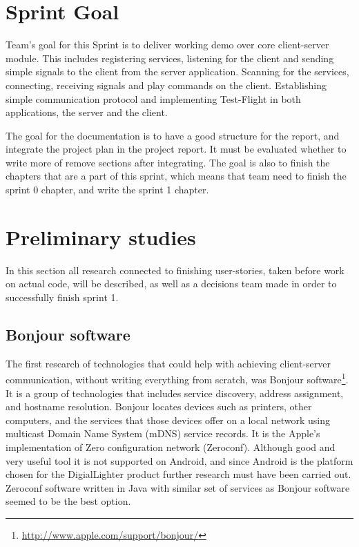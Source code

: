 \section{Sprint Goal}

Team's goal for this Sprint is to deliver working demo over core client-server module.
This includes registering services, listening for the client and sending simple signals to the client from the server application.
Scanning for the services, connecting, receiving signals and play commands on the client.
Establishing simple communication protocol and implementing Test-Flight in both applications, the server and the client.

The goal for the documentation is to have a good structure for the report, and integrate the project plan in the project report. It must be evaluated whether to write more of remove sections after integrating. The goal is also to finish the chapters that are a part of this sprint, which means that team need to finish the sprint 0 chapter, and write the sprint 1 chapter.

\section {Preliminary studies}
In this section all research connected to finishing user-stories, taken before work on actual code, will be described, as well as a decisions team made in order to successfully finish sprint 1.

\subsection{Bonjour software}
The first research of technologies that could help with achieving client-server communication, without writing everything from scratch, was Bonjour software\footnote{\url{http://www.apple.com/support/bonjour/}}. 
It is a group of technologies that includes service discovery, address assignment, and hostname resolution. 
Bonjour locates devices such as printers, other computers, and the services that those devices offer on a local network using multicast Domain Name System (mDNS) service records.
It is the Apple's implementation of Zero configuration network (Zeroconf).
Although good and very useful tool it is not supported on Android, and since Android is the platform chosen for the DigialLighter product further research must have been carried out.
Zeroconf software written in Java with similar set of services as Bonjour software seemed to be the best option.

